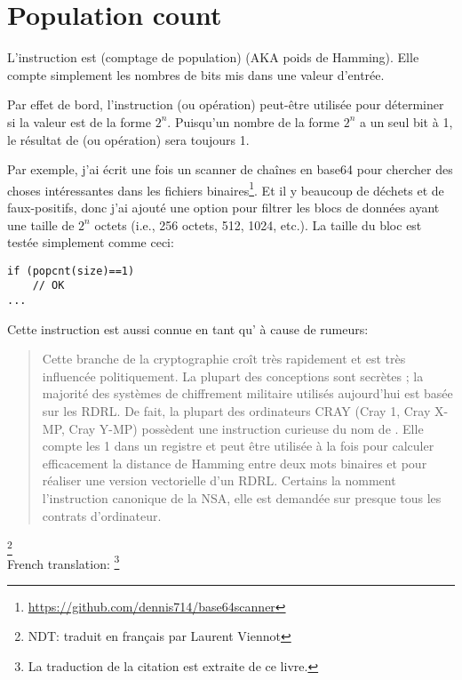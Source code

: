 \section{Population count}
\label{POPCNT}

L'instruction  est  (comptage de population) (\ac{AKA}
poids de Hamming). Elle compte simplement les nombres de bits mis dans une valeur
d'entrée.

Par effet de bord, l'instruction  (ou opération) peut-être utilisée pour
déterminer si la valeur est de la forme $2^n$. Puisqu'un nombre de la forme $2^n$
a un seul bit à 1, le résultat de  (ou opération) sera toujours 1.

Par exemple, j'ai écrit une fois un scanner de chaînes en base64 pour chercher des
choses intéressantes dans les fichiers binaires\footnote{\url{https://github.com/dennis714/base64scanner}}.
Et il y  beaucoup de déchets et de faux-positifs, donc j'ai ajouté une option pour
filtrer les blocs de données ayant une taille de $2^n$ octets (i.e., 256 octets,
512, 1024, etc.).
La taille du bloc est testée simplement comme ceci:

\begin{lstlisting}[style=customc]
if (popcnt(size)==1)
	// OK
...
\end{lstlisting}

Cette instruction est aussi connue en tant qu' à cause de
rumeurs:

\begin{framed}
\begin{quotation}
Cette branche de la cryptographie croît très rapidement et est très influencée politiquement.
La plupart des conceptions sont secrètes ; la majorité des systèmes de chiffrement
militaire utilisés aujourd'hui est basée sur les RDRL. De fait, la plupart des ordinateurs
CRAY (Cray 1, Cray X-MP, Cray Y-MP) possèdent une instruction curieuse du
nom de .
Elle compte les 1 dans un registre et peut être
utilisée à la fois pour calculer efficacement la distance de Hamming entre deux mots
binaires et pour réaliser une version vectorielle d'un RDRL. Certains la nomment
l'instruction canonique de la NSA, elle est demandée sur presque tous les contrats
d'ordinateur.
\end{quotation}
\end{framed}
\InSqBrackets{\Schneier{}}\footnote{NDT: traduit en français par Laurent Viennot}\\
French translation: \footnote{La
traduction de la citation est extraite de ce livre.}


